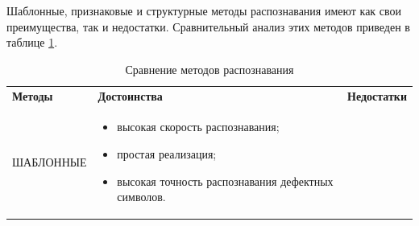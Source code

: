 Шаблонные, признаковые и структурные методы распознавания имеют как свои
преимущества, так и недостатки. Сравнительный анализ этих методов приведен в
таблице \ref{intro_table_review}.
\begin{table}[]
\caption{Сравнение методов распознавания}
\label{intro_table_review}
\fontsize{12pt}{14pt}\selectfont
\begin{tabularx}{\linewidth}{|l |X| X|}
\hhline{|---|}
\textbf{Методы}      & \textbf{Достоинства} & \textbf{Недостатки} \\
\hhline{|---|}
ШАБЛОННЫЕ   &   \begin{itemize}[leftmargin=*,nosep]
 \item высокая скорость распознавания;
 \item простая реализация;
 \item высокая точность распознавания дефектных символов.
\end{itemize} 


\end{tabularx}
\end{table}
